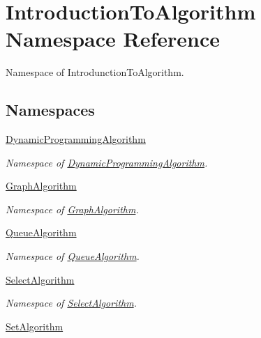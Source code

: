 \hypertarget{namespace_introduction_to_algorithm}{}\section{Introduction\+To\+Algorithm Namespace Reference}
\label{namespace_introduction_to_algorithm}


Namespace of Introdunction\+To\+Algorithm.  


\subsection*{Namespaces}
\begin{DoxyCompactItemize}
\item 
 \hyperlink{namespace_introduction_to_algorithm_1_1_dynamic_programming_algorithm}{Dynamic\+Programming\+Algorithm}
\begin{DoxyCompactList}\small\item\em Namespace of \hyperlink{namespace_introduction_to_algorithm_1_1_dynamic_programming_algorithm}{Dynamic\+Programming\+Algorithm}. \end{DoxyCompactList}\item 
 \hyperlink{namespace_introduction_to_algorithm_1_1_graph_algorithm}{Graph\+Algorithm}
\begin{DoxyCompactList}\small\item\em Namespace of \hyperlink{namespace_introduction_to_algorithm_1_1_graph_algorithm}{Graph\+Algorithm}. \end{DoxyCompactList}\item 
 \hyperlink{namespace_introduction_to_algorithm_1_1_queue_algorithm}{Queue\+Algorithm}
\begin{DoxyCompactList}\small\item\em Namespace of \hyperlink{namespace_introduction_to_algorithm_1_1_queue_algorithm}{Queue\+Algorithm}. \end{DoxyCompactList}\item 
 \hyperlink{namespace_introduction_to_algorithm_1_1_select_algorithm}{Select\+Algorithm}
\begin{DoxyCompactList}\small\item\em Namespace of \hyperlink{namespace_introduction_to_algorithm_1_1_select_algorithm}{Select\+Algorithm}. \end{DoxyCompactList}\item 
 \hyperlink{namespace_introduction_to_algorithm_1_1_set_algorithm}{Set\+Algorithm}

\end{DoxyCompactItemize}
